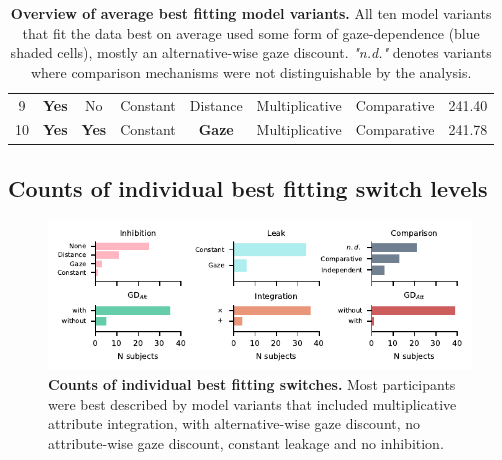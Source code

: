 \documentclass[11pt, a4paper]{article}
\begin{document}
\begin{table}[!ht]
\begin{centering}
\begin{tabular}{@{}cccccccc@{}}
9    & \cellcolor[HTML]{DAE8FC}\textbf{Yes} & No                          & Constant                     & Distance                     & Multiplicative & Comparative   & 241.40 \\
10   & \cellcolor[HTML]{DAE8FC}\textbf{Yes} & \cellcolor[HTML]{DAE8FC}\textbf{Yes} & Constant                     & \cellcolor[HTML]{DAE8FC}\textbf{Gaze} & Multiplicative & Comparative   & 241.78 \\ \bottomrule
\end{tabular}
\caption{\textbf{Overview of average best fitting model variants.} All ten model variants that fit the data best on average used some form of gaze-dependence (blue shaded cells), mostly an alternative-wise gaze discount. \textit{"n.d."} denotes variants where comparison mechanisms were not distinguishable by the analysis.}
\label{tab:switchboard-best-agg}
\end{centering}
\end{table}
\clearpage

\subsection*{Counts of individual best fitting switch levels}
\begin{figure}[!ht]
\begin{centering}
\includegraphics[scale=1]{../figures/S_switch-level_individual_counts.pdf}
\caption{\textbf{Counts of individual best fitting switches.} Most participants were best described by model variants that included multiplicative attribute integration, with alternative-wise gaze discount, no attribute-wise gaze discount, constant leakage and no inhibition.}
\label{fig:switchboard-ind-switch-counts}
\end{centering}
\end{figure}
\newpage
\end{document}
